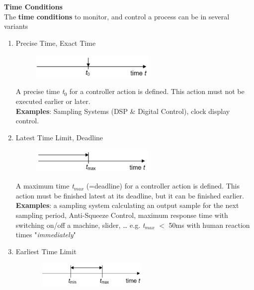 {\rot\bf Time Conditions}\\
The \textbf{time conditions} to monitor, and control a process can be in several variants

\begin{enumerate}
\item Precise Time, Exact Time 
	
	\begin{figure}[h]
    \centering
    \includegraphics[width=6cm, height=1.2cm]{Images/image62.png}
    \label{fig:Fig 8}
	\end{figure} 

A precise time \textit{t}${}_{0}$ for a controller action is defined. This action must not be executed earlier or later.\\
\textbf{Examples}: Sampling Systems (DSP \& Digital Control),      clock display control.

\item Latest Time Limit, Deadline 

	\begin{figure}[h]
    \centering
    \includegraphics[width=6cm, height=1.2cm]{Images/image63.png}
    \label{fig:Fig 9}
    \end{figure}
    
A maximum time \textit{t}${}_{max}$ (=deadline) for a controller action is defined. This action must be finished latest at its deadline, but it can be finished earlier.\\ 
\textbf{Examples}: a sampling system calculating an output sample for the next sampling      period, Anti-Squeeze Control, maximum response time with switching      on/off a machine, slider, {\dots}      e.g. \textit{t${}_{max}$} $\mathrm{<}$ 50ms with human reaction times  "\textit{immediately}"    

\item Earliest Time Limit 
	
	\begin{figure}[h]
    \centering
    \includegraphics[width=6cm, height=1.2cm]{Images/image64.png}
    \label{fig:Fig 10}
    \end{figure}
    

\end{enumerate}
